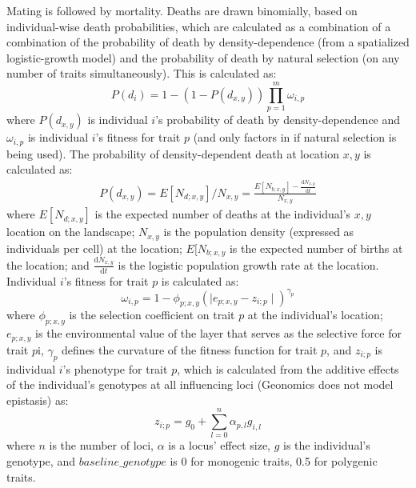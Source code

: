 ﻿\documentclass{article}
\begin{document}
Mating is followed by mortality. Deaths are drawn binomially, based on 
individual-wise death probabilities, which are calculated as a combination of
a combination of the probability of death by density-dependence (from a spatialized logistic-growth model)
and the probability of death by natural selection (on any number of traits simultaneously). 
This is calculated as:
\begin{equation}
        P(d_{i}) = 1 - (1 - P(d_{x,y})) \prod_{p = 1}^{m}\omega_{i,p}
\label{eqxn:prob_death_i}
\end{equation}
where $P(d_{x,y})$ is individual $i$'s probability of death by density-dependence
and $\omega_{i,p}$ is individual $i$'s fitness for trait $p$
(and only factors in if natural selection is being used).
The probability of density-dependent death at location $x,y$ is calculated as:
\begin{equation}
\begin{split}
       P(d_{x,y}) = E[N_{d;x,y}]/N_{x,y} = \frac{E[N_{b;x,y}] - \frac{\mathrm{d}N_{x,y}}{\mathrm{d}t}}{N_{x,y}}
\label{eqxn:prob_death_xy}
\end{split}
\end{equation}
where $E[N_{d;x,y}]$ is the expected number of deaths at the individual's $x,y$ location on the landscape;
$N_{x,y}$ is the population density (expressed as individuals per cell) at the location;
$E[N_{b;x,y}$ is the expected number of births at the location;
and $\frac{\mathrm{d}N_{x,y}}{\mathrm{d}t}$ is the logistic population growth rate at the location.
Individual $i$'s fitness for trait $p$ is calculated as:
\begin{equation}
        \omega_{i,p}= 1 - \phi_{p;x,y} {( \mid e_{p;x,y} - z_{i;p} \mid )}^{\gamma_{p}}
\label{eqxn:fitness}
\end{equation}
where $\phi_{p;x,y}$ is the selection coefficient on trait $p$ at the
individual's location; $e_{p;x,y}$ is the environmental value
of the layer that serves as the selective force for trait $p$i,
$\gamma_{p}$ defines the curvature of the fitness function for trait $p$,
and $z_{i;p}$ is individual $i$'s phenotype for trait $p$, which is calculated
from the additive effects of the individual's genotypes at all influencing loci
(Geonomics does not model epistasis) as:
\begin{equation}
        z_{i;p} = g_{0} + \sum_{l = 0}^{n} \alpha_{p,l} g_{i,l}
\label{eqxn:phenotype}
\end{equation}
where $n$ is the number of loci, $\alpha$ is a locus' effect size, $g$ is the
individual's genotype, and $baseline\_genotype$ is 0 for monogenic traits,
0.5 for polygenic traits. 
\end{document}
